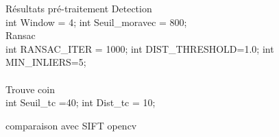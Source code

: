 \begin{frame}{Résultats pré-traitement}
{Detection\\
int Window = 4;
int Seuil_moravec = 800;\\


Ransac \\
int RANSAC_ITER = 1000;
int DIST_THRESHOLD=1.0;
int MIN_INLIERS=5;\\\\

Trouve coin\\
int Seuil_tc =40;
int Dist_tc = 10;
}

\end{frame}
\begin{frame}{comparaison avec SIFT opencv}
\begin{center}
    \begin{minipage}{0.48\textwidth}
    \end{minipage}
    \hfill
    \begin{minipage}{0.48\textwidth}
    \end{minipage}
    \end{center}
\end{frame}